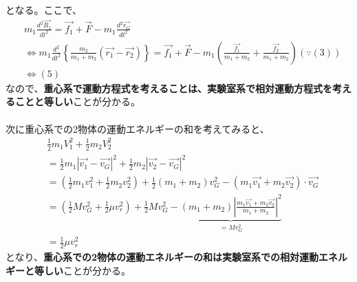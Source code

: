 \documentclass[dvipdfmx,11pt]{jsarticle}
\begin{document}
となる。ここで、
{\large\begin{align*}
     & m_1\frac{d^2\vec{R_1}}{dt^2}=\vec{f_1}+\vec{F}-m_1\frac{d^2\vec{r_G}}{dt^2}
    \\&\Leftrightarrow m_1\frac{d^2}{dt^2}\left\{\frac{m_2}{m_1+m_2}\left(\vec{r_1}-\vec{r_2}\right)\right\}=\vec{f_1}+\vec{F}-m_1\left(\frac{\vec{f_1}}{m_1+m_2}+\frac{\vec{f_2}}{m_1+m_2}\right)(\because(3))
    \\&\Leftrightarrow(5)
\end{align*}
}
なので、{\bf 重心系で運動方程式を考えることは、実験室系で相対運動方程式を考えることと等しい}ことが分かる。
\\\\次に重心系での2物体の運動エネルギーの和を考えてみると、
{\large
\begin{align*}
     & \frac{1}{2}m_1 V_1^2+\frac{1}{2}m_2V_2^2
    \\&=\frac{1}{2}m_1\left|\vec{v_1}-\vec{v_G}\right|^2+\frac{1}{2}m_2\left|\vec{v_2}-\vec{v_G}\right|^2
    \\&=\left(\frac{1}{2}m_1 v_1^2+\frac{1}{2}m_2v_2^2\right)+\frac{1}{2}(m_1+m_2)v_G^2-\left(m_1\vec{v_1}+m_2\vec{v_2}\right)\cdot\vec{v_G}
    \\&=\left(\frac{1}{2}Mv_G^2+\frac{1}{2}\mu v_r^2\right)+\frac{1}{2}Mv_G^2-\underbrace{(m_1+m_2)\left|\frac{m_1\vec{v_1}+m_2\vec{v_2}}{m_1+m_2}\right|^2}_{=Mv_G^2}
    \\&=\frac{1}{2}\mu v_r^2
\end{align*}
}
となり、{\bf 重心系での2物体の運動エネルギーの和は実験室系での相対運動エネルギーと等しい}ことが分かる。
\end{document}
